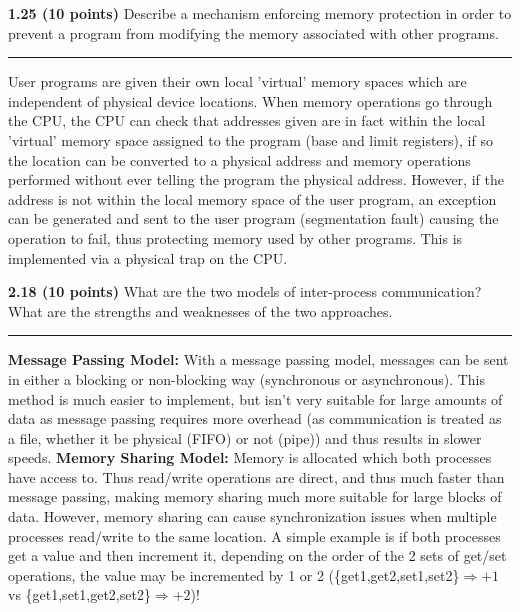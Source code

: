 \documentclass[12pt]{jhwhw}
\begin{document}
\bigbreak
\textbf{1.25 (10 points)} Describe a mechanism enforcing memory protection in order to prevent
a program from modifying the memory associated with other programs.
\textcolor[RGB]{240,240,240}{\rule{\textwidth}{0.5pt}}\bigbreak

	\begin{addmargin}[1em]{}
		User programs are given their own local 'virtual' memory spaces which are
		independent of physical device locations.
		When memory operations go through the CPU, the CPU can check
		that addresses given are in fact within the local 'virtual' memory space assigned
		to the program (base and limit registers), 
		if so the location can be converted to a physical address and memory
		operations performed without ever telling the program the physical address. However,
		if the address is not within the local memory space of the user program, an exception
		can be generated and sent to the user program (segmentation fault) causing the
		operation to fail, thus protecting memory used by other programs.
		This is implemented via a physical trap on the CPU.
	\end{addmargin}

\bigbreak
\textbf{2.18 (10 points)} What are the two models of inter-process communication? What
are the strengths and weaknesses of the two approaches.
\textcolor[RGB]{240,240,240}{\rule{\textwidth}{0.5pt}}\bigbreak

	\begin{addmargin}[1em]{}
		\textbf{Message Passing Model:} With a message passing model, messages can be sent
			in either a blocking or non-blocking way (synchronous or asynchronous). This
			method is much easier to implement, but isn't very suitable for large 
			amounts of data as message passing requires more overhead (as communication
			is treated as a file, whether it be physical (FIFO) or not (pipe)) and thus
			results in slower speeds.
		\bigbreak
		\textbf{Memory Sharing Model:} Memory is allocated which both processes have access
			to. Thus read/write operations are direct, and thus much faster than message
			passing, making memory sharing much more suitable for large blocks of data.
			However, memory sharing can cause synchronization issues when multiple processes
			read/write to the same location. A simple example is if both processes get a value
			and then increment it, depending on the order of the 2 sets of get/set operations, the
			value may be incremented by 1 or 2 
			(\{get1,get2,set1,set2\}$\Rightarrow+1$ vs \{get1,set1,get2,set2\}$\Rightarrow+2$)!
	\end{addmargin}
\end{document}
